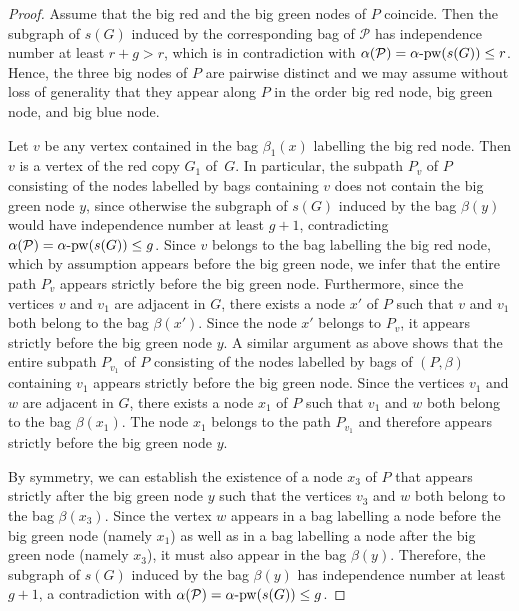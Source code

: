 \documentclass[11pt]{article}
\newcommand{\pw}{\mathrm{pw}}
\newcommand{\s}{s}
\newcommand{\pin}{\alpha \textnormal{-} \pw}
\theoremstyle{plain}
\theoremstyle{definition}
\theoremstyle{remark}
\numberwithin{equation}{section}
\begin{document}
\begin{proof}
Assume that the big red and the big green nodes of $P$ coincide.
Then the subgraph of $\s(G)$ induced by the corresponding bag of $\mathcal{P}$ has independence number at least $r+g>r$, which is in contradiction with $\alpha(\mathcal{P}) = \pin(\s(G)) \le r$.
Hence, the three big nodes of $P$ are pairwise distinct and we may assume without loss of generality that they appear along $P$ in the order big red node, big green node, and big blue node.

Let $v$ be any vertex contained in the bag $\beta_1(x)$ labelling the big red node.
Then $v$ is a vertex of the red copy $G_1$ of~$G$.
In particular, the subpath $P_v$ of $P$ consisting of the nodes labelled by bags containing $v$ does not contain the big green node $y$, since otherwise the subgraph of $\s(G)$ induced by the bag $\beta(y)$ would have independence number at least $g+1$, contradicting
$\alpha(\mathcal{P}) = \pin(\s(G)) \le g$.
Since $v$ belongs to the bag labelling the big red node, which by assumption appears before the big green node, we infer that the entire path $P_v$ appears strictly before the big green node.
Furthermore, since the vertices $v$ and $v_1$ are adjacent in $G$, there exists a node $x'$ of $P$ such that $v$ and $v_1$ both belong to the bag $\beta(x')$.
Since the node $x'$ belongs to $P_v$, it appears strictly before the big green node $y$.
A similar argument as above shows that the entire subpath $P_{v_1}$ of $P$ consisting of the nodes labelled by bags of $(P,\beta)$ containing $v_1$ appears strictly before the big green node.
Since the vertices $v_1$ and $w$ are adjacent in $G$, there exists a node $x_1$ of $P$ such that $v_1$ and $w$ both belong to the bag $\beta(x_1)$.
The node $x_1$ belongs to the path $P_{v_1}$ and therefore appears strictly before the big green node $y$.

By symmetry, we can establish the existence of a node $x_3$ of $P$ that appears strictly after the big green node $y$ such that the vertices $v_3$ and $w$ both belong to the bag $\beta(x_3)$.
Since the vertex $w$ appears in a bag labelling a node before the big green node (namely $x_1$) as well as in a bag labelling a node after the big green node  (namely $x_3$), it must also appear in the bag $\beta(y)$.
Therefore, the subgraph of $\s(G)$ induced by the bag  $\beta(y)$ has independence number at least $g+1$, a contradiction with $\alpha(\mathcal{P}) = \pin(\s(G)) \le g$.
\end{proof}
\end{document}
